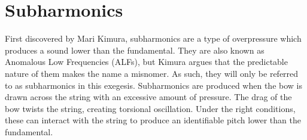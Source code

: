 

\newpage
\section{Subharmonics}\label{sec:subharmonicsDiscussion}
First discovered by Mari Kimura, subharmonics are a type of overpressure which produces a sound lower than the fundamental.\autocite{kimuraHowProduceSubharmonics1999} 
They are also known as Anomalous Low Frequencies (ALFs), but Kimura argues that the predictable nature of them makes the name a misnomer.\autocite[]{kimuraHowProduceSubharmonics1999}
As such, they will only be referred to as subharmonics in this exegesis.
Subharmonics are produced when the bow is drawn across the string with an excessive amount of pressure.
The drag of the bow twists the string, creating torsional oscillation. 
Under the right conditions, these can interact with the string to produce an identifiable pitch lower than the fundamental.\autocite{Subharmonics2006}

